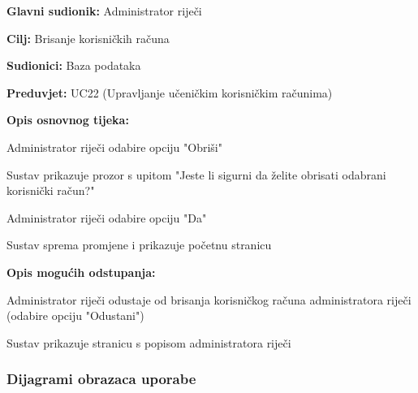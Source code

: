 				\noindent {}
				\begin{packed_item}
					
					\item \textbf{Glavni sudionik: }Administrator riječi
					\item  \textbf{Cilj:} Brisanje korisničkih računa
					\item  \textbf{Sudionici:} Baza podataka
					\item  \textbf{Preduvjet:} UC22 (Upravljanje učeničkim korisničkim računima)
					\item  \textbf{Opis osnovnog tijeka:}
					
					\item[] \begin{packed_enum}
						
						\item Administrator riječi odabire opciju "Obriši"
						\item Sustav prikazuje prozor s upitom "Jeste li sigurni da želite obrisati odabrani korisnički račun?"
						\item Administrator riječi odabire opciju "Da"
						\item Sustav sprema promjene i prikazuje početnu stranicu
						
					\end{packed_enum}
					
					\item  \textbf{Opis mogućih odstupanja:}
					
					\item[] \begin{packed_item}
						
						
						\item[2.a] Administrator riječi odustaje od brisanja korisničkog računa administratora riječi (odabire opciju "Odustani")
						\item[] \begin{packed_enum}
							
							\item Sustav prikazuje stranicu s popisom administratora riječi
							
						\end{packed_enum}
					\end{packed_item}
				\end{packed_item}
				
				\newpage
					
				\subsubsection{Dijagrami obrazaca uporabe}
					
